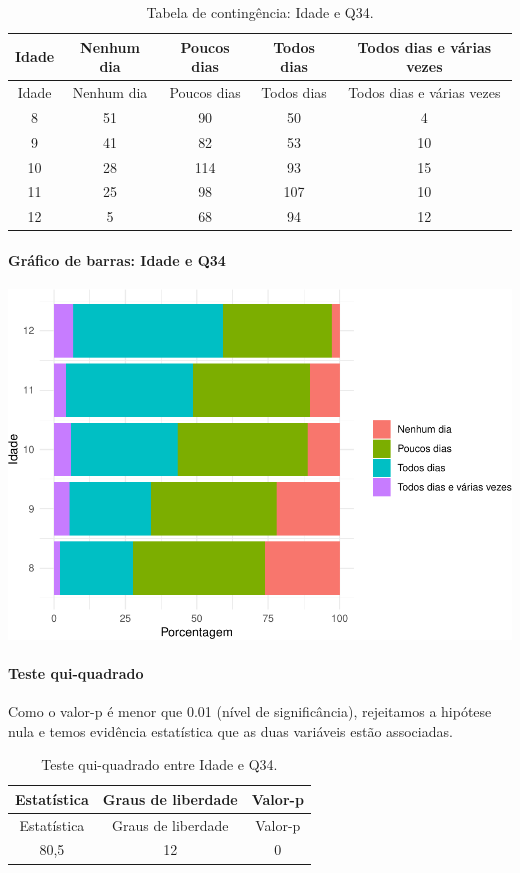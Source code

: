 \documentclass[]{article}
\let\oldparagraph\paragraph
\renewcommand{\paragraph}[1]{\oldparagraph{#1}\mbox{}}
\begin{document}
\begin{longtable}[]{@{}ccccc@{}}
\caption{\label{tab:unnamed-chunk-1212}Tabela de contingência: Idade e Q34.}\tabularnewline
\toprule
Idade & Nenhum dia & Poucos dias & Todos dias & Todos dias e várias vezes\tabularnewline
\midrule
\endfirsthead
\toprule
Idade & Nenhum dia & Poucos dias & Todos dias & Todos dias e várias vezes\tabularnewline
\midrule
\endhead
8 & 51 & 90 & 50 & 4\tabularnewline
9 & 41 & 82 & 53 & 10\tabularnewline
10 & 28 & 114 & 93 & 15\tabularnewline
11 & 25 & 98 & 107 & 10\tabularnewline
12 & 5 & 68 & 94 & 12\tabularnewline
\bottomrule
\end{longtable}

\hypertarget{gruxe1fico-de-barras-idade-e-q34}{%
\paragraph{Gráfico de barras: Idade e Q34}\label{gruxe1fico-de-barras-idade-e-q34}}

\begin{center}\includegraphics[width=0.75\linewidth]{relatorio_covid19_files/figure-latex/unnamed-chunk-1213-1} \end{center}

\hypertarget{teste-qui-quadrado-104}{%
\paragraph{Teste qui-quadrado}\label{teste-qui-quadrado-104}}

Como o valor-p é menor que 0.01 (nível de significância), rejeitamos a hipótese nula e temos evidência estatística que as duas variáveis estão associadas.

\begin{longtable}[]{@{}ccc@{}}
\caption{\label{tab:unnamed-chunk-1215}Teste qui-quadrado entre Idade e Q34.}\tabularnewline
\toprule
Estatística & Graus de liberdade & Valor-p\tabularnewline
\midrule
\endfirsthead
\toprule
Estatística & Graus de liberdade & Valor-p\tabularnewline
\midrule
\endhead
80,5 & 12 & 0\tabularnewline
\bottomrule
\end{longtable}
\end{document}
